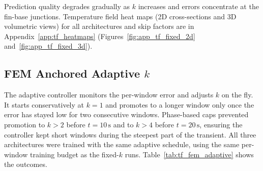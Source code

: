 Prediction quality degrades gradually as $k$ increases and errors concentrate at the fin-base junctions.
Temperature field heat maps (2D cross-sections and 3D volumetric views) for all architectures and skip factors are in Appendix~\ref{app:tf_heatmaps} (Figures~\ref{fig:app_tf_fixed_2d} and~\ref{fig:app_tf_fixed_3d}).

\subsection{FEM Anchored Adaptive \texorpdfstring{$k$}{k}}
\label{subsec:tf_fem_adaptive}

The adaptive controller monitors the per-window error and adjusts $k$ on the
fly. It starts conservatively at $k=1$ and promotes to a longer window only
once the error has stayed low for two consecutive windows. Phase-based caps
prevented promotion to $k>2$ before $t=10\,\mathrm{s}$ and to $k>4$ before
$t=20\,\mathrm{s}$, ensuring the controller kept short windows during the
steepest part of the transient. All three architectures were trained with the
same adaptive schedule, using the same per-window training budget as the
fixed-$k$ runs. Table~\ref{tab:tf_fem_adaptive} shows the outcomes.

\begin{table}[H]
\centering
\caption{Thermal Fin adaptive-$k$ controller: FEM savings, accuracy, and window schedule.}
\label{tab:tf_fem_adaptive}
\end{table}

